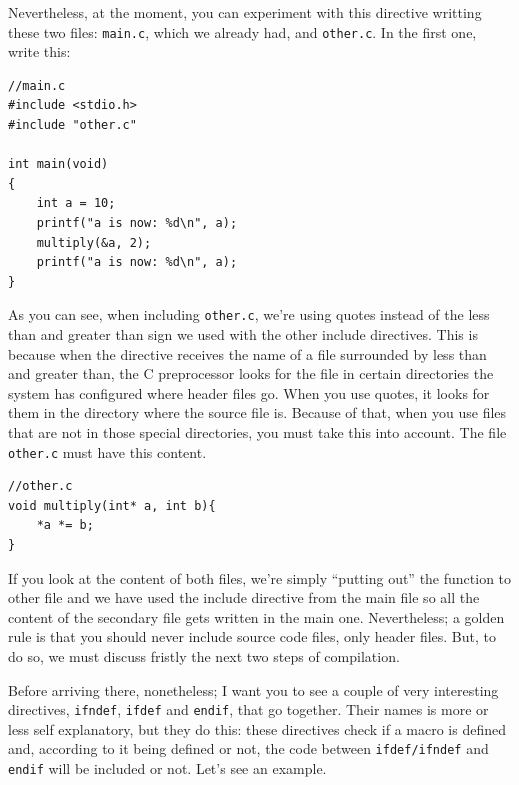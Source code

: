 \documentclass[a4paper]{article}
\begin{document}
Nevertheless, at the moment, you can experiment with this directive writting
these two files: \verb!main.c!, which we already had, and \verb!other.c!. In the
first one, write this:

\noindent
\begin{minipage}[H]{\linewidth}
\mbox{}
\begin{lstlisting}[style=C,
caption={Example of \texttt{include} directive, main file},
label={lst:include1}]
//main.c
#include <stdio.h>
#include "other.c"

int main(void)
{
    int a = 10;
    printf("a is now: %d\n", a);
    multiply(&a, 2);
    printf("a is now: %d\n", a);
}
\end{lstlisting}
\end{minipage}

As you can see, when including \verb!other.c!, we're using quotes instead of the
less than and greater than sign we used with the other include directives. This
is because when the directive receives the name of a file surrounded by less
than and greater than, the C preprocessor looks for the file in certain
directories the system has configured where header files go. When you use
quotes, it looks for them in the directory where the source file is. Because of
that, when you use files that are not in those special directories, you must
take this into account. The file \verb!other.c! must have this content.

\noindent
\begin{minipage}[H]{\linewidth}
\mbox{}
\begin{lstlisting}[style=C,
caption={Example of \texttt{include} directive, included file},
label={lst:include2}]
//other.c
void multiply(int* a, int b){
    *a *= b;
}
\end{lstlisting}
\end{minipage}

If you look at the content of both files, we're simply ``putting out'' the
function to other file and we have used the include directive from the main file
so all the content of the secondary file gets written in the main one.
Nevertheless; a golden rule is that you should never include source code files,
only header files. But, to do so, we must discuss fristly the next two steps
of compilation.

Before arriving there, nonetheless; I want you to see a couple of very
interesting directives, \verb!ifndef!, \verb!ifdef! and \verb!endif!, that go
together. Their names is more or less self explanatory, but they do this: these
directives check if a macro is defined and, according to it being defined or
not, the code between \verb!ifdef/ifndef! and \verb!endif! will be included or
not. Let's see an example.
\end{document}
